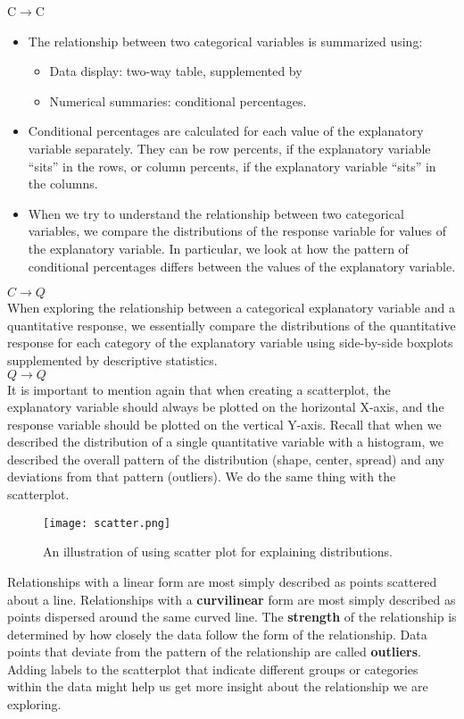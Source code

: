\documentclass[10pt, a4paper]{article}
\begin{document}
C$\rightarrow$C
\begin{itemize}
\item The relationship between two categorical variables is summarized using:
\begin{itemize}
\item Data display: two-way table, supplemented by
\item Numerical summaries: conditional percentages.
\end{itemize}
\item Conditional percentages are calculated for each value of the explanatory variable separately. They can be row percents, if the explanatory variable ``sits'' in the rows, or column percents, if the explanatory variable ``sits'' in the columns.
\item When we try to understand the relationship between two categorical variables, we compare the distributions of the response variable for values of the explanatory variable. In particular, we look at how the pattern of conditional percentages differs between the values of the explanatory variable.
\end{itemize}
$C\rightarrow Q$\\
When exploring the relationship between a categorical explanatory variable and a quantitative response, we essentially compare the distributions of the quantitative response for each category of the explanatory variable using side-by-side boxplots supplemented by descriptive statistics.\\
$Q\rightarrow Q$\\
It is important to mention again that when creating a scatterplot, the explanatory variable should always be plotted on the horizontal X-axis, and the response variable should be plotted on the vertical Y-axis.
Recall that when we described the distribution of a single quantitative variable with a histogram, we described the overall pattern of the distribution (shape, center, spread) and any deviations from that pattern (outliers). We do the same thing with the scatterplot.\\
\begin{figure}
[h!]
\centering
\texttt{[image: scatter.png]}
\caption{An illustration of using scatter plot for explaining distributions.}
\end{figure}
Relationships with a linear form are most simply described as points scattered about a line. 
Relationships with a \textbf{curvilinear} form are most simply described as points dispersed around the same curved line. The \textbf{strength} of the relationship is determined by how closely the data follow the form of the relationship. Data points that deviate from the pattern of the relationship are called \textbf{outliers}.\\
Adding labels to the scatterplot that indicate different groups or categories within the data might help us get more insight about the relationship we are exploring.\\
\end{document}
